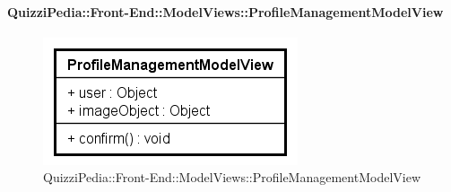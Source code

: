 	\paragraph{QuizziPedia::Front-End::ModelViews::ProfileManagementModelView}
	
	\label{QuizziPedia::Front-End::ModelViews::ProfileManagementModelView}
	
	\begin{figure}[ht]
		\centering
		\includegraphics[scale=0.80,keepaspectratio]{UML/Classi/Front-End/QuizziPedia_Front-end_ModelView_ProfileManagementModelView.png}
		\caption{QuizziPedia::Front-End::ModelViews::ProfileManagementModelView}
	\end{figure} \FloatBarrier
	
